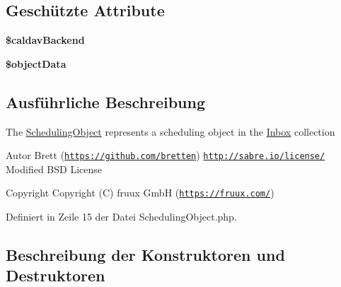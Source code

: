 \subsection*{Geschützte Attribute}
\begin{DoxyCompactItemize}
\item 
\mbox{\label{class_sabre_1_1_cal_d_a_v_1_1_schedule_1_1_scheduling_object_aea226d4790ce56b56d893a954ed1a256}} 
{\bfseries \$caldav\+Backend}
\item 
\mbox{\label{class_sabre_1_1_cal_d_a_v_1_1_schedule_1_1_scheduling_object_ae15ba093bea518c0cbb0d1af7f20ea73}} 
{\bfseries \$object\+Data}
\end{DoxyCompactItemize}


\subsection{Ausführliche Beschreibung}
The \mbox{\hyperlink{class_sabre_1_1_cal_d_a_v_1_1_schedule_1_1_scheduling_object}{Scheduling\+Object}} represents a scheduling object in the \mbox{\hyperlink{class_sabre_1_1_cal_d_a_v_1_1_schedule_1_1_inbox}{Inbox}} collection

\begin{DoxyAuthor}{Autor}
Brett (\href{https://github.com/bretten}{\tt https\+://github.\+com/bretten})  \href{http://sabre.io/license/}{\tt http\+://sabre.\+io/license/} Modified B\+SD License 
\end{DoxyAuthor}
\begin{DoxyCopyright}{Copyright}
Copyright (C) fruux GmbH (\href{https://fruux.com/}{\tt https\+://fruux.\+com/}) 
\end{DoxyCopyright}


Definiert in Zeile 15 der Datei Scheduling\+Object.\+php.



\subsection{Beschreibung der Konstruktoren und Destruktoren}
\mbox{\label{class_sabre_1_1_cal_d_a_v_1_1_schedule_1_1_scheduling_object_afacf850aa5840bb5c56943345a06547e}} 
